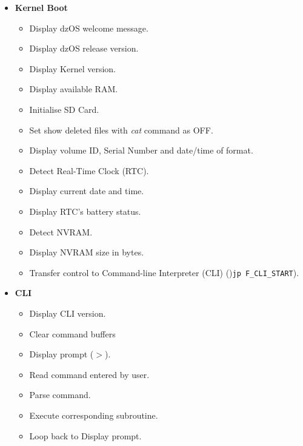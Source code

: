 \documentclass[a4paper,11pt]{article}
\begin{document}
\begin{itemize}
\begin{itemize}
        \end{itemize}
        \item \textbf{Kernel Boot}
        \begin{itemize}
            \item Display dzOS welcome message.
            \item Display dzOS release version.
            \item Display Kernel version.
            \item Display available RAM.
            \item Initialise SD Card.
            \item Set show deleted files with \textit{cat} command as OFF.
            \item Display volume ID, Serial Number and date/time of format.
            \item Detect Real-Time Clock (RTC).
            \item Display current date and time.
            \item Display RTC's battery status.
            \item Detect NVRAM.
            \item Display NVRAM size in bytes.
            \item Transfer control to Command-line Interpreter (CLI) ()\texttt{jp F\_CLI\_START}).
        \end{itemize}
        \item \textbf{CLI}
        \begin{itemize}
            \item Display CLI version.
            \item Clear command buffers
            \item Display prompt ($>$).
            \item Read command entered by user.
            \item Parse command.
            \item Execute corresponding subroutine.
            \item Loop back to Display prompt.
        \end{itemize}
    \end{itemize}
\end{document}
